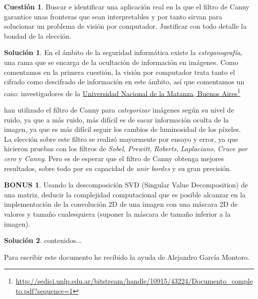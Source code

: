 \documentclass[a4paper, 11pt]{article}
\newcommand\fnurl[2]{%
  \href{#2}{#1}\footnote{\url{#2}}%
}
\theoremstyle{definition}
\newtheorem{cuestion}{Cuestión}
\newtheorem*{solucion}{Solución}
\newtheorem*{bonus}{BONUS}
\begin{document}
  \begin{cuestion}
     	Buscar e identificar una aplicación real en la que el filtro de
      Canny garantice unas fronteras que sean interpretables y por tanto sirvan
      para solucionar un problema de visión por computador.
      Justificar con todo detalle la bondad de la elección.

  \end{cuestion}

  \begin{solucion}
     	En el ámbito de la seguridad informática existe la \textit{esteganografía},
      una rama que se encarga de la ocultación de información en imágenes. Como
      comentamos en la primera cuestión, la visión por computador trata tanto el
      cifrado como descifrado de información en este ámbito, así que comentamos un
      caso: investigadores de la
      \fnurl{Universidad Nacional de la Matanza, Buenos Aires}{http://sedici.unlp.edu.ar/bitstream/handle/10915/43224/Documento_completo.pdf?sequence=1}
      han utilizado el filtro de Canny para \textit{categorizar} imágenes según
      su nivel de ruido, ya que a más ruido, más difícil es de sacar información
      oculta de la imagen, ya que es más difícil seguir los cambios de luminosidad
      de los píxeles. \\

      La elección sobre este filtro se realizó mayormente por ensayo y error,
      ya que hicieron pruebas con los filtros de \textit{Sobel}, \textit{Prewitt},
      \textit{Roberts}, \textit{Laplaciano}, \textit{Cruce por cero} y \textit{Canny}.
      Pero es de esperar que el filtro de Canny obtenga mejores resultados, sobre
      todo por su capacidad de \textit{unir bordes} y su gran precisión.
  \end{solucion}
  \begin{bonus}
     	Usando la descomposición SVD (Singular Value
      Decomposition) de una matriz, deducir la complejidad computacional que es
      posible alcanzar en la implementación de la convolución 2D de una imagen
      con una máscara 2D de valores y tamaño cualesquiera (suponer la máscara de
      tamaño inferior a la imagen).

  \end{bonus}

  \begin{solucion}
     	contenidos...
  \end{solucion}

  Para escribir este documento he recibido la ayuda de Alejandro García Montoro.
\end{document}
